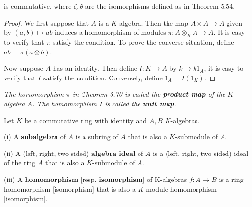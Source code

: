 \begin{theorem}
\begin{center}
\end{center}
is commutative, where $\zeta,\theta$ are the isomorphisms defined as in Theorem 5.54.
\end{theorem}
\begin{proof}
We first suppose that $A$ is a $K$-algebra. Then the map $A\times A\to A$ given by $(a,b)\mapsto ab$ induces a homomorphism of modules $\pi:A\otimes_KA\to A$. It is easy to verify that $\pi$ satisfy the condition. To prove the converse situation, define $ab=\pi(a\otimes b)$.\par
Now suppose $A$ has an identity. Then define $I:K\to A$ by $k\mapsto k1_A$, it is easy to verify that $I$ satisfy the condition. Conversely, define $1_A=I(1_K)$.
\end{proof}
\begin{note}\em
The homomorphism $\pi$ in Theorem 5.70 is called the \textbf{product map} of the $K$-algebra $A$. The homomorphism $I$ is called the \textbf{unit map}.
\end{note}
\begin{definition}
Let $K$ be a commutative ring with identity and $A,B$ $K$-algebras.\par
(i) A \textbf{subalgebra} of $A$ is a subring of $A$ that is also a $K$-submodule of $A$.\par
(ii) A (left, right, two sided) \textbf{algebra ideal} of $A$ is a (left, right, two sided) ideal of the ring $A$ that is also a $K$-submodule of $A$.\par
(iii) A \textbf{homomorphism} [resp. \textbf{isomorphism}] of $\mathrm{K}$-algebras $f:A\to B$ is a ring homomorphism [isomorphism] that is also a $K$-module homomorphism [isomorphism].
\end{definition}
